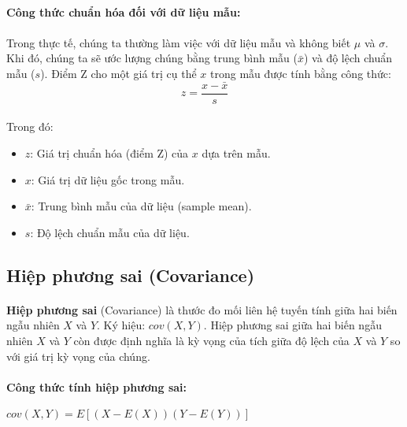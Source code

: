 \paragraph{}{\textbf{Công thức chuẩn hóa đối với dữ liệu mẫu:}}

\paragraph{}{Trong thực tế, chúng ta thường làm việc với dữ liệu mẫu và không biết $\mu$ và $\sigma$. Khi đó, chúng ta sẽ ước lượng chúng bằng trung bình mẫu ($\bar{x}$) và độ lệch chuẩn mẫu ($s$). Điểm Z cho một giá trị cụ thể $x$ trong mẫu được tính bằng công thức:}
\[
z = \frac{x - \bar{x}}{s}
\]
\paragraph{}{Trong đó:}
\begin{itemize}
    \item $z$: Giá trị chuẩn hóa (điểm Z) của $x$ dựa trên mẫu.
    \item $x$: Giá trị dữ liệu gốc trong mẫu.
    \item $\bar{x}$: Trung bình mẫu của  dữ liệu (sample mean).
    \item $s$: Độ lệch chuẩn mẫu của dữ liệu.
\end{itemize}



\subsection{Hiệp phương sai (Covariance)}

\paragraph{}{\textbf{Hiệp phương sai} (Covariance) \cite{thongke-descriptive-statistics} là thước đo mối liên hệ tuyến tính giữa hai biến ngẫu nhiên $X$ và $Y$. Ký hiệu: $cov(X, Y)$. Hiệp phương sai giữa hai biến ngẫu nhiên $X$ và $Y$ còn được định nghĩa là kỳ vọng của tích giữa độ lệch của $X$ và $Y$ so với giá trị kỳ vọng của chúng.}

\paragraph{}{\textbf{Công thức tính hiệp phương sai:}}

\begin{center}
\large $cov(X, Y) = E[(X-E(X))(Y-E(Y))]$
\end{center}

